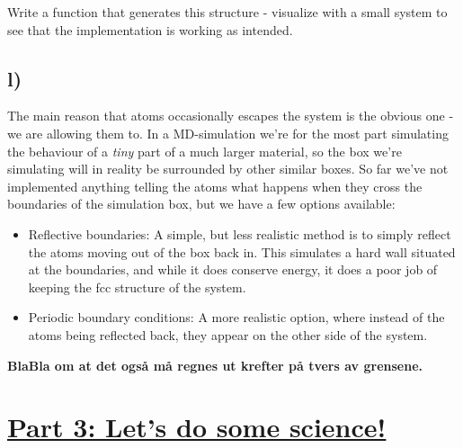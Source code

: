 \documentclass[11pt,british,a4paper]{report}
\begin{document}
Write a function that generates this structure - visualize with a small system to see that the implementation is working as intended.

\subsection*{l)}

The main reason that atoms occasionally escapes the system is the obvious one - we are allowing them to. In a MD-simulation we're for the most part simulating the behaviour of a \textit{tiny}
part of a much larger material, so the box we're simulating will in reality be surrounded by other similar boxes. So far we've not implemented anything telling the atoms what happens when they cross
the boundaries of the simulation box, but we have a few options available:

\begin{itemize}
 \item Reflective boundaries: A simple, but less realistic method is to simply reflect the atoms moving out of the box back in. This simulates a hard wall situated at the boundaries,
 and while it does conserve energy, it does a poor job of keeping the fcc structure of the system.
 \item Periodic boundary conditions: A more realistic option, where instead of the atoms being reflected back, they appear on the other side of the system.
\end{itemize}

\textbf{BlaBla om at det også må regnes ut krefter på tvers av grensene.}




\section*{\underline{Part 3: Let's do some science!}}

\nocite{*}
\printbibliography{}
\end{document}
